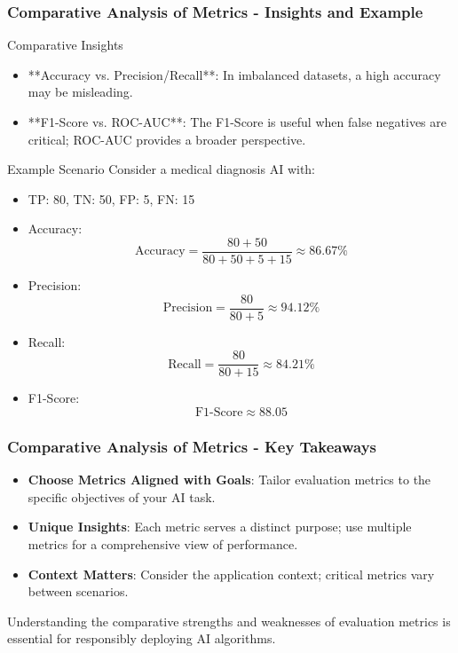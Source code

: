 \documentclass[aspectratio=169]{beamer}
\begin{document}
\begin{frame}[fragile]
    \frametitle{Comparative Analysis of Metrics - Insights and Example}
    \begin{block}{Comparative Insights}
        \begin{itemize}
            \item **Accuracy vs. Precision/Recall**: 
            In imbalanced datasets, a high accuracy may be misleading.
            \item **F1-Score vs. ROC-AUC**: 
            The F1-Score is useful when false negatives are critical; ROC-AUC provides a broader perspective.
        \end{itemize}
    \end{block}
    
    \begin{block}{Example Scenario}
        Consider a medical diagnosis AI with:
        \begin{itemize}
            \item TP: 80, TN: 50, FP: 5, FN: 15
            \item Accuracy:
            \begin{equation}
            \text{Accuracy} = \frac{80 + 50}{80 + 50 + 5 + 15} \approx 86.67\%
            \end{equation}
            \item Precision:
            \begin{equation}
            \text{Precision} = \frac{80}{80 + 5} \approx 94.12\%
            \end{equation}
            \item Recall:
            \begin{equation}
            \text{Recall} = \frac{80}{80 + 15} \approx 84.21\%
            \end{equation}
            \item F1-Score:
            \begin{equation}
            \text{F1-Score} \approx 88.05
            \end{equation}
        \end{itemize}
    \end{block}
\end{frame}

\begin{frame}[fragile]
    \frametitle{Comparative Analysis of Metrics - Key Takeaways}
    \begin{itemize}
        \item \textbf{Choose Metrics Aligned with Goals}: Tailor evaluation metrics to the specific objectives of your AI task.
        \item \textbf{Unique Insights}: Each metric serves a distinct purpose; use multiple metrics for a comprehensive view of performance.
        \item \textbf{Context Matters}: Consider the application context; critical metrics vary between scenarios.
    \end{itemize}
    
    Understanding the comparative strengths and weaknesses of evaluation metrics is essential for responsibly deploying AI algorithms.
\end{frame}
\end{document}
